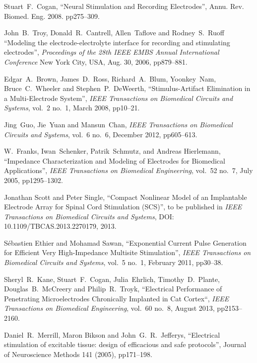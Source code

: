 \documentclass[journal, a4paper]{IEEEtran}
\begin{document}
\begin{thebibliography}{99}


    Stuart~F.~Cogan,
    ``Neural Stimulation and Recording Electrodes'',
    Annu. Rev. Biomed. Eng. 2008. pp275--309.

    John~B.~Troy, Donald~R.~Cantrell, Allen~Taflove and Rodney~S.~Ruoff
    ``Modeling the electrode-electrolyte interface for recording and stimulating electrodes'',
    {\em Proceedings of the 28th IEEE EMBS Annual International Conference}
    New York City, USA, Aug. 30, 2006, pp879--881.

    Edgar~A.~Brown, James~D.~Ross, Richard~A.~Blum, Yoonkey~Nam, Bruce~C.~Wheeler and Stephen~P.~DeWeerth,
    ``Stimulus-Artifact Elimination in a Multi-Electrode System'',
    {\em IEEE Transactions on Biomedical Circuits and Systems},
    vol.~2 no.~1, March 2008, pp10--21.

    Jing~Guo, Jie~Yuan and Mansun~Chan,
    {\em IEEE Transactions on Biomedical Circuits and Systems},
    vol.~6 no.~6, December 2012, pp605--613.

    W.~Franks, Iwan~Schenker, Patrik~Schmutz, and Andreas Hierlemann,
    ``Impedance Characterization and Modeling of Electrodes for Biomedical Applications'',
    \emph{IEEE Transactions on Biomedical Engineering},
    vol.~52 no.~7, July 2005, pp1295--1302.

    Jonathan Scott and Peter Single,
    ``Compact Nonlinear Model of an Implantable Electrode Array for Spinal Cord Stimulation (SCS)'',
    to be published in
    \emph{IEEE Transactions on Biomedical Circuits and Systems},
    DOI: 10.1109/TBCAS.2013.2270179, 2013.

    Sébastien Ethier and Mohamad Sawan,
    ``Exponential Current Pulse Generation for Efficient Very High-Impedance Multisite Stimulation'',
    \emph{IEEE Transactions on Biomedical Circuits and Systems},
    vol.~5 no.~1, February 2011, pp30--38.


    Sheryl~R.~Kane, Stuart~F.~Cogan, Julia~Ehrlich, Timothy~D.~Plante, Douglas~B.~McCreery and Philip~R.~Troyk,
    ``Electrical Performance of Penetrating Microelectrodes Chronically Implanted in Cat Cortex``,
    {\em IEEE Transactions on Biomedical Engineering},
    vol.~60 no.~8, August 2013, pp2153--2160.

    Daniel~R.~Merrill, Maron Bikson and John~G.~R.\ Jefferys,
    ``Electrical stimulation of excitable tissue: design of efficacious and safe protocols'',
    Journal of Neuroscience Methods 141 (2005), pp171--198.


\end{thebibliography}
\end{document}
